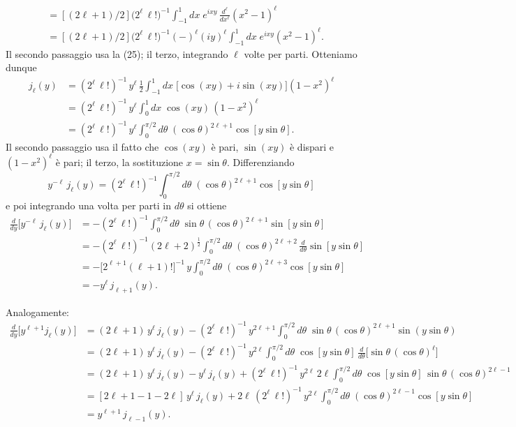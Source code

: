 \documentclass[11pt, a4paper]{book}
\numberwithin{equation}{section}
\begin{document}
\begin{description}
\begin{align*}
  &= \left[(2\ell+1)/2\right]\bigl(2^\ell\,\ell!\bigr)^{-1}
    \int_{-1}^{1} dx\; e^{ixy}\,\frac{d^\ell}{dx^\ell}(x^2-1)^\ell\\
  &= \left[(2\ell+1)/2\right]\bigl(2^\ell\,\ell!\bigr)^{-1}(-)^\ell(iy)^\ell
    \int_{-1}^{1} dx\; e^{ixy}(x^2-1)^\ell.
\end{align*}
Il secondo passaggio usa la (25); il terzo, integrando $\ell$ volte per parti. Otteniamo dunque
\begin{align*}
  j_\ell(y) &= (2^\ell\,\ell!)^{-1}\,y^\ell\,\tfrac{1}{2}
    \int_{-1}^{1} dx\;\bigl[\cos(xy)+i\sin(xy)\bigr](1-x^2)^\ell\\
  &= (2^\ell\,\ell!)^{-1}\,y^\ell \int_{0}^{1} dx\;\cos(xy)\,(1-x^2)^\ell\\
  &= (2^\ell\,\ell!)^{-1}\,y^\ell \int_{0}^{\pi/2} d\theta\;(\cos\theta)^{2\ell+1}\cos[y\sin\theta].
\end{align*}
Il secondo passaggio usa il fatto che $\cos(xy)$ è pari, $\sin(xy)$ è dispari e $(1-x^2)^\ell$ è pari; il terzo, la sostituzione $x=\sin\theta$. Differenziando
\[
  y^{-\ell}\,j_\ell(y) = (2^\ell\,\ell!)^{-1}
  \int_{0}^{\pi/2} d\theta\;(\cos\theta)^{2\ell+1}\cos[y\sin\theta]
\]
e poi integrando una volta per parti in $d\theta$ si ottiene
\begin{align*}
  \frac{d}{dy}\bigl[y^{-\ell}\,j_\ell(y)\bigr]
  &= -(2^\ell\,\ell!)^{-1}\int_{0}^{\pi/2}d\theta\;\sin\theta\,(\cos\theta)^{2\ell+1}\sin[y\sin\theta]\\
  &= -(2^\ell\,\ell!)^{-1}(2\ell+2)^{\frac{1}{2}} %
    \int_{0}^{\pi/2}d\theta\;(\cos\theta)^{2\ell+2}\,\frac{d}{d\theta}\sin[y\sin\theta]\\
  &= -\bigl[2^{\ell+1}(\ell+1)!\bigr]^{-1}\,y
    \int_{0}^{\pi/2}d\theta\;(\cos\theta)^{2\ell+3}\cos[y\sin\theta]\\
  &= -y^\ell\,j_{\ell+1}(y).
\end{align*}


Analogamente:
\begin{align*}
\frac{d}{dy}\bigl[y^{\ell+1} j_\ell(y)\bigr]
&= (2\ell+1)\,y^\ell\,j_\ell(y) - (2^\ell\,\ell!)^{-1}\,y^{2\ell+1}
  \int_0^{\pi/2} d\theta\;\sin\theta\,(\cos\theta)^{2\ell+1}\sin(y\sin\theta)\\
&= (2\ell+1)\,y^\ell\,j_\ell(y)
  - (2^\ell\,\ell!)^{-1}\,y^{2\ell}
  \int_0^{\pi/2} d\theta\;\cos[y\sin\theta]\,\frac{d}{d\theta}\bigl[\sin\theta\,(\cos\theta)^\ell\bigr] %
  \\
&= (2\ell+1)\,y^\ell\,j_\ell(y) - y^\ell\,j_\ell(y)
  + (2^\ell\,\ell!)^{-1}\,y^{2\ell}\,2\ell
  \int_0^{\pi/2} d\theta\;\cos[y\sin\theta]\,\sin\theta\,(\cos\theta)^{2\ell-1}
  \\
&= [2\ell+1-1-2\ell]\,y^\ell\,j_\ell(y)
  + 2\ell\,(2^\ell\,\ell!)^{-1}\,y^{2\ell}
  \int_0^{\pi/2} d\theta\;(\cos\theta)^{2\ell-1}\cos[y\sin\theta]\\
&= y^{\ell+1}\,j_{\ell-1}(y).
\end{align*}


\end{description}
\end{document}
